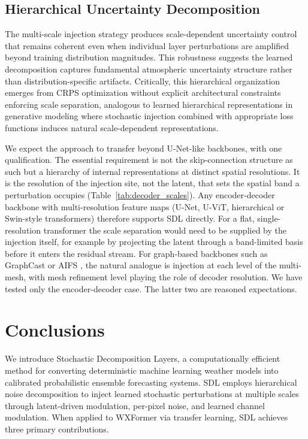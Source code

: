 \documentclass{agujournal2019}
\begin{document}
\subsection{Hierarchical Uncertainty Decomposition}

The multi-scale injection strategy produces scale-dependent uncertainty control that remains coherent even when individual layer perturbations are amplified beyond training distribution magnitudes. This robustness suggests the learned decomposition captures fundamental atmospheric uncertainty structure rather than distribution-specific artifacts. Critically, this hierarchical organization emerges from CRPS optimization without explicit architectural constraints enforcing scale separation, analogous to learned hierarchical representations in generative modeling \cite{karras2019style, karras2020analyzing} where stochastic injection combined with appropriate loss functions induces natural scale-dependent representations.

We expect the approach to transfer beyond U-Net-like backbones, with one qualification. The essential requirement is not the skip-connection structure as such but a hierarchy of internal representations at distinct spatial resolutions. It is the resolution of the injection site, not the latent, that sets the spatial band a perturbation occupies (Table~\ref{tab:decoder_scales}). Any encoder-decoder backbone with multi-resolution feature maps (U-Net, U-ViT, hierarchical or Swin-style transformers) therefore supports SDL directly. For a flat, single-resolution transformer the scale separation would need to be supplied by the injection itself, for example by projecting the latent through a band-limited basis before it enters the residual stream. For graph-based backbones such as GraphCast or AIFS \cite{Lam2023graphcast, lang2024aifs}, the natural analogue is injection at each level of the multi-mesh, with mesh refinement level playing the role of decoder resolution. We have tested only the encoder-decoder case. The latter two are reasoned expectations.


\section{Conclusions}

We introduce Stochastic Decomposition Layers, a computationally efficient method for converting deterministic machine learning weather models into calibrated probabilistic ensemble forecasting systems. SDL employs hierarchical noise decomposition to inject learned stochastic perturbations at multiple scales through latent-driven modulation, per-pixel noise, and learned channel modulation. When applied to WXFormer via transfer learning, SDL achieves three primary contributions.
\end{document}
